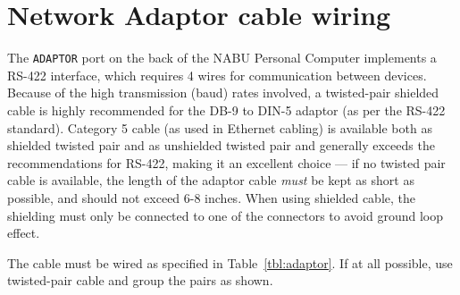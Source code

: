 
\section{Network Adaptor cable wiring}
The \texttt{ADAPTOR} port on the back of the NABU Personal Computer implements a RS-422 interface, which requires 4 wires for communication between devices. Because of the high transmission (baud) rates involved, a twisted-pair shielded cable is highly recommended for the DB-9 to DIN-5 adaptor (as per the RS-422 standard). Category 5 cable (as used in Ethernet cabling) is available both as shielded twisted pair and as unshielded twisted pair and generally exceeds the recommendations for RS-422, making it an excellent choice --- if no twisted pair cable is available, the length of the adaptor cable \textit{must} be kept as short as possible, and should not exceed 6-8 inches. When using shielded cable, the shielding must only be connected to one of the connectors to avoid ground loop effect.

The cable must be wired as specified in Table~\ref{tbl:adaptor}. If at all possible, use twisted-pair cable and group the pairs as shown.

